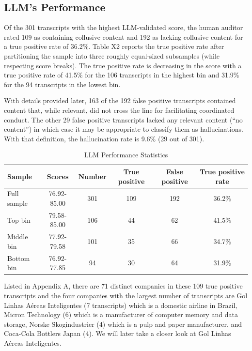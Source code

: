\subsection{LLM’s Performance}
Of the 301 transcripts with the highest LLM-validated score, the human auditor rated 109 as containing collusive content and 192 as lacking collusive content for a true positive rate of 36.2\%. Table X2 reports the true positive rate after partitioning the sample into three roughly equal-sized subsamples (while respecting score breaks). The true positive rate is decreasing in the score with a true positive rate of 41.5\% for the 106 transcripts in the highest bin and 31.9\% for the 94 transcripts in the lowest bin.

With details provided later, 163 of the 192 false positive transcripts contained content that, while relevant, did not cross the line for facilitating coordinated conduct. The other 29 false positive transcripts lacked any relevant content (``no content'') in which case it may be appropriate to classify them as hallucinations. With that definition, the hallucination rate is 9.6\% (29 out of 301).

\begin{table}[htbp]
    \centering
    \caption{LLM Performance Statistics}
    \begin{tabular}{l c c c c c}
        \hline
        Sample & Scores & Number & True positive & False positive & True positive rate \\
        \hline
        Full sample & 76.92-85.00 & 301 & 109 & 192 & 36.2\% \\
        Top bin & 79.58-85.00 & 106 & 44 & 62 & 41.5\% \\
        Middle bin & 77.92-79.58 & 101 & 35 & 66 & 34.7\% \\
        Bottom bin & 76.92-77.85 & 94 & 30 & 64 & 31.9\% \\
        \hline
    \end{tabular}
    \label{tab:X2}
\end{table}

Listed in Appendix A, there are 71 distinct companies in these 109 true positive transcripts and the four companies with the largest number of transcripts are Gol Linhas Aéreas Inteligentes (7 transcripts) which is a domestic airline in Brazil, Micron Technology (6) which is a manufacturer of computer memory and data storage, Norske Skogindustrier (4) which is a pulp and paper manufacturer, and Coca-Cola Bottlers Japan (4). We will later take a closer look at Gol Linhas Aéreas Inteligentes.

